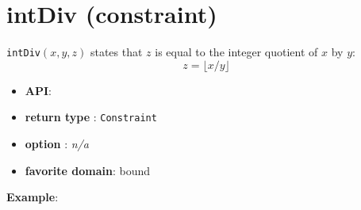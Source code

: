 \label{intdiv}
\hypertarget{intdiv}{}

\section{intDiv (constraint)}\label{intdiv:intdivconstraint}\hypertarget{intdiv:intdivconstraint}{}
\begin{notedef}
  \texttt{intDiv}$(x,y,z)$ states that $z$ is equal to the integer quotient of $x$ by $y$:
$$z = \lfloor x / y \rfloor$$
\end{notedef}

\begin{itemize}
	\item \textbf{API}: 
	\item \textbf{return type} : \texttt{Constraint}
	\item \textbf{option} : \emph{n/a}
	\item \textbf{favorite domain}: bound
\end{itemize}

\textbf{Example}:

